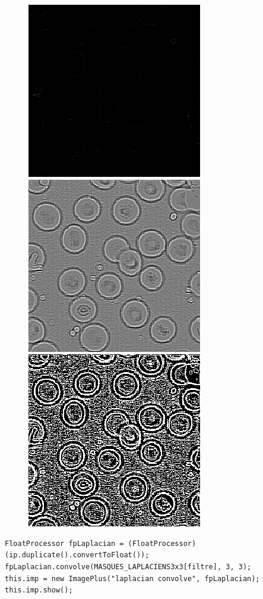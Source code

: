 \documentclass[a4paper,12pt]{report}
\begin{document}
\begin{figure}[!ht]
	\center	
	\includegraphics[scale=0.5]{image/laplacian_convolve1.png}	
	\includegraphics[scale=0.5]{image/laplacian_convolve2.png}	
	\includegraphics[scale=0.5]{image/laplacian_convolve4.png}	
\end{figure}


\begin{lstlisting}[style=Java]
FloatProcessor fpLaplacian = (FloatProcessor)(ip.duplicate().convertToFloat());
fpLaplacian.convolve(MASQUES_LAPLACIENS3x3[filtre], 3, 3);
this.imp = new ImagePlus("laplacian convolve", fpLaplacian);
this.imp.show();
\end{lstlisting}
\end{document}
